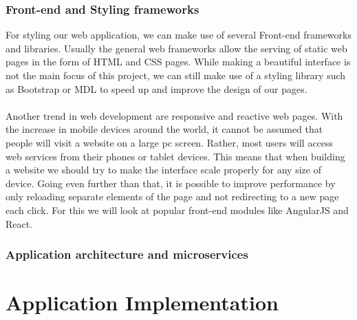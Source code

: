\documentclass[12pt]{article}
\begin{document}
\begin{multicols}{2}
\subsubsection{Front-end and Styling frameworks}
For styling our web application, we can make use of several Front-end frameworks and libraries. Usually the general web frameworks allow the serving of static web pages in the form of HTML and CSS pages. While making a beautiful interface is not the main focus of this project, we can still make use of a styling library such as Bootstrap or MDL to speed up and improve the design of our pages.
\\\\
Another trend in web development are responsive and reactive web pages. With the increase in mobile devices around the world, it cannot be assumed that people will visit a website on a large pc screen. Rather, most users will access web services from their phones or tablet devices. This means that when building a website we should try to make the interface scale properly for any size of device. Going even further than that, it is possible to improve performance by only reloading separate elements of the page and not redirecting to a new page each click. For this we will look at popular front-end modules like AngularJS and React. 
\subsubsection{Application architecture and microservices}



\end{multicols}
\section{Application Implementation}\label{sec:implementation}
\end{document}
